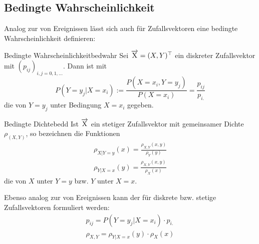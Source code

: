 \subsection{Bedingte Wahrscheinlichkeit}

Analog zur  von Ereignissen lässt sich
auch für Zufallsvektoren eine bedingte Wahrscheinlichkeit definieren:

\begin{definition}{Bedingte Wahrscheinlichkeit}{bedwahr}
Sei $\overrightarrow{\mathrm{X}} = (X, Y)^\top$ ein diskreter Zufallsvektor mit
 $(p_{ij})_{i,j=0,1,...}$. Dann ist
mit
\[
P(Y=y_j|X=x_i) := \frac{P(X=x_i, Y=y_j)}{P(X=x_i)} = \frac{p_{ij}}{p_{i.}}
\]
die  von $Y=y_j$ unter Bedingung $X=x_i$ gegeben.
\end{definition}

\begin{definition}{Bedingte Dichte}{bedd}
Ist $\overrightarrow{\mathrm{X}}$ ein stetiger Zufallsvektor mit gemeinsamer Dichte
$\rho_{(X,Y)}$, so bezeichnen die Funktionen
\begin{align*}
\rho_{X|Y=y}(x) = \frac{\rho_{X,Y}(x,y)}{\rho_Y(y)}\\
\rho_{Y|X=x}(y) = \frac{\rho_{X,Y}(x,y)}{\rho_X(x)}
\end{align*}
die  von $X$ unter $Y=y$ bzw. $Y$ unter $X=x$.
\end{definition}

Ebenso analog zur  von Ereignissen kann
der  für diskrete bzw. stetige Zufallsvektoren
formuliert werden:
\begin{align*}
p_{ij} = P(Y=y_j|X=x_i)\cdot p_{i.}\\
\rho_{X,Y} = \rho_{Y|X=x}(y)\cdot\rho_X(x)
\end{align*}
